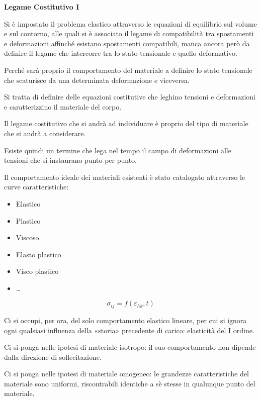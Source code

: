 \documentclass{article}
\begin{document}
\begin{adjustwidth}{2in}{}
{\Large \textbf{Legame Costitutivo I}} \newline 

	Si è impostato il problema elastico	attraverso le equazioni di equilibrio sul volume e sul contorno, alle quali si è associato il legame di compatibilità tra spostamenti e deformazioni affinché esistano spostamenti compatibili, manca ancora però da definire il legame che intercorre tra lo stato tensionale e quello deformativo. \newline 
	
	Perché sarà proprio il comportamento del materiale a definire lo stato tensionale che scaturisce da una determinata deformazione e viceversa. \newline
	
	Si tratta di definire delle equazioni costitutive che leghino tensioni e deformazioni e
	caratterizzino il materiale del corpo. 
	
	Il legame costitutivo che si andrà ad individuare è proprio del tipo di materiale che si andrà a considerare. \newline 

	Esiste quindi un termine che lega nel tempo il campo di deformazioni alle tensioni che si instaurano punto per punto. \newline 

	Il comportamento ideale dei materiali esistenti è stato catalogato attraverso le curve caratteristiche: 
	\begin{itemize}
		\item Elastico
		\item Plastico
		\item Viscoso
		\item Elasto plastico
		\item Visco plastico
		\item \dots
	\end{itemize}

	\[ \sigma_{ij} = f(\varepsilon_{hk}, t)\]
	
	Ci si occupi, per ora, del solo comportamento elastico lineare, per cui si ignora ogni qualsiasi
	influenza della «storia» precedente di carico: elasticità del I ordine. \newline 
	
	Ci si ponga nelle ipotesi di materiale isotropo: il suo comportamento non dipende dalla direzione
	di sollecitazione.\newline
	
	Ci si ponga nelle ipotesi di materiale omogeneo: le grandezze caratteristiche del materiale sono
	uniformi, riscontrabili identiche a sè stesse in qualunque punto del materiale. \newline 
	

\end{adjustwidth}
\end{document}
